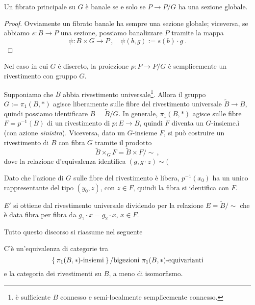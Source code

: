 \begin{prop}
	Un fibrato principale su $G$ è banale se e solo se $P \to P/G$ ha una sezione globale.
	\begin{proof}
		Ovviamente un fibrato banale ha sempre una sezione globale; viceversa,
		se abbiamo $s:B \to P$ una sezione, possiamo banalizzare $P$ tramite la mappa
		\begin{equation*}
			\psi : B \times G \longrightarrow P\,,
			\quad \psi(b,g) := s(b) \cdot g\,.
		\end{equation*}
	\end{proof}
\end{prop}


Nel caso in cui $G$ è discreto, la proiezione $p : P \to P/G$ è semplicemente un rivestimento
con gruppo $G$. 

Supponiamo che $B$ abbia rivestimento universale\footnote{è sufficiente $B$ connesso e semi-localmente semplicemente connesso.}. Allora il gruppo $G:=\pi_{1}(B,\ast)$ agisce liberamente
sulle fibre del rivestimento universale $\widetilde{B} \to B$, quindi possiamo identificare
$B = \widetilde{B}/G$. In generale, $\pi_{1}(B,\ast)$ agisce sulle fibre $F = p^{-1}(B)$ 
di un rivestimento di $p:E \to B$, quindi $F$ diventa un $G$-insieme.ì (con azione \emph{sinistra}).
Viceversa, dato un $G$-insieme $F$, si può costruire un rivestimento di $B$ con
fibra $G$ tramite il prodotto
\begin{equation*}
	\widetilde{B} \times_{G} F = \widetilde{B} \times F / \sim\,,
\end{equation*}
dove la relazione d'equivalenza identifica $(g,g\cdot z) \sim ($


Dato che l'azione di $G$ sulle fibre del rivestimento è libera, $p^{-1}(x_{0})$
ha un unico rappresentante del tipo $(y_{0},z)$, con $z \in F$, quindi la fibra
si identifica con $F$.

\begin{exercise}
	$E'$ si ottiene dal rivestimento universale
	dividendo per la relazione $E=\widetilde{B}/\sim$ 
	che è data fibra per fibra da $g_{1} \cdot x = g_{2} \cdot x$,
	$x \in F$.
\end{exercise}

Tutto questo discorso si riassume nel seguente

\begin{thm}
	C'è un'equivalenza di categorie tra
	\begin{equation*}
		\Set{\pi_{1}(B,\ast)\text{-insiemi}}/\text{bigezioni } \pi_{1}(B,\ast)\text{-equivarianti}
	\end{equation*}
	e la categoria dei rivestimenti su $B$, a meno di isomorfismo.
\end{thm}

